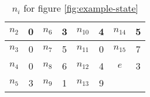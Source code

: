 \begin{table}[h]
  \centering
  \caption{$n_i$ for figure \ref{fig:example-state}} \label{my-label}
  \begin{tabular}{ c c c c c c c c }
    \hline
    $n_2$ & 0 & $n_6$ & 3 & $n_{10}$ & 4 & $n_{14}$ & 5  \\ \hline
    $n_3$ & 0 & $n_7$ & 5 & $n_{11}$ & 0 & $n_{15}$ & 7  \\ \hline
    $n_4$ & 0 & $n_8$ & 6 & $n_{12}$ & 4 & $e$      & 3  \\ \hline
    $n_5$ & 3 & $n_9$ & 1 & $n_{13}$ & 9 &          &    \\ \hline
  \end{tabular}
\end{table}
